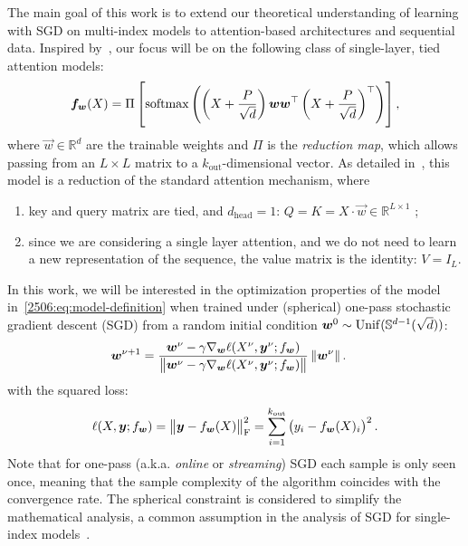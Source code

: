 The main goal of this work is to extend our theoretical understanding of learning with SGD on multi-index models to attention-based architectures and sequential data. Inspired by~\cite{cui2024phase,troiani2025fundamental}, our focus will be on the following class of single-layer, tied attention models:
\begin{equation} \label{2506:eq:model-definition}
    \vec{f}_{\vec{w}}(X) = \Pi\left[
        \SoftMax{\left(\left(X+\frac{P}{\sqrt{d}}\right)\vec{w}\vec{w}^\top\left(X+\frac{P}{\sqrt{d}}\right)^\top\right)}
    \right],
\end{equation}
where $\vec{w}\in \mathbb{R}^{d}$ are the trainable weights and $\Pi$ is the \emph{reduction map}, which allows passing from an $L\times L$ matrix to a $k_\mathrm{out}$-dimensional vector. As detailed in~, this model is a reduction of the standard attention mechanism, where
\begin{enumerate}
    \item key and query matrix are tied, and $d_\mathrm{head} = 1$: $Q=K=X\cdot \vec{w}\in \mathbb{R}^{L\times 1}$ ; 
    \item since we are considering a single layer attention, and we do not need to learn a new representation of the sequence, the value matrix is the identity: $V=I_{L}$.
\end{enumerate}

In this work, we will be interested in the optimization properties of the model in~\cref{2506:eq:model-definition} when trained under (spherical) one-pass stochastic gradient descent (SGD) from a random initial condition $\vec{w}^0 \sim {\rm Unif}(\mathbb{S}^{d-1}(\sqrt{d}))$:
\begin{equation}\label{2506:eq:normalized-SGD-w}
\begin{split}
    \vec{w}^{\nu+1} &= \frac{\vec{w}^\nu - \gamma \nabla_{\vec{w}} \ell(X^\nu, \vec{y}^\nu; f_{\vec{w}})}{\left\lVert \vec{w}^\nu - \gamma \nabla_{\vec{w}} \ell(X^\nu, \vec{y}^\nu; f_{\vec{w}})\right\rVert}
    \norm{\vec{w}^\nu}.
\end{split}\end{equation}
with the squared loss:
\begin{equation}
    \ell(X, \vec{y}; f_{\vec{w}}) =
        \left\lVert\vec{y} - f_{\vec{w}}(X)\right\rVert^2_{\rm F} =
        \sum_{i=1}^{k_\mathrm{out}} \left(y_i - f_{\vec{w}}(X)_i\right)^2.
\end{equation}
Note that for one-pass (a.k.a. \emph{online} or \emph{streaming}) SGD each sample is only seen once, meaning that the sample complexity of the algorithm coincides with the convergence rate. The spherical constraint is considered to simplify the mathematical analysis, a common assumption in the analysis of SGD for single-index models~\citep{arous2021online,damian2022neural}.

